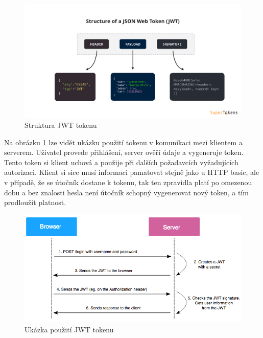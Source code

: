 \begin{figure}[htbp]
    \centering
        \includegraphics[scale=.09]{obrazky-figures/implementation/jwt-structure.png}
        \caption{Struktura JWT tokenu\protect\footnotemark}
\end{figure}


\noindent
Na obrázku \ref{fig:jwt-communication} lze vidět ukázku použití tokenu v komunikaci mezi klientem a serverem. Uživatel provede přihlášení, server ověří údaje a vygeneruje token. Tento token si klient uchová a použije při dalších požadavcích vyžadujících autorizaci. Klient si sice musí informaci pamatovat stejně jako u HTTP basic, ale v případě, že se útočník dostane k tokenu, tak ten zpravidla platí po omezenou dobu a bez znalosti hesla není útočník schopný vygenerovat nový token, a tím prodloužit platnost.

\begin{figure}[htbp]
    \centering
        \includegraphics[scale=.6]{obrazky-figures/implementation/jwt_communication.png}
        \caption{Ukázka použití JWT tokenu\protect\footnotemark}
        \label{fig:jwt-communication}
\end{figure}


